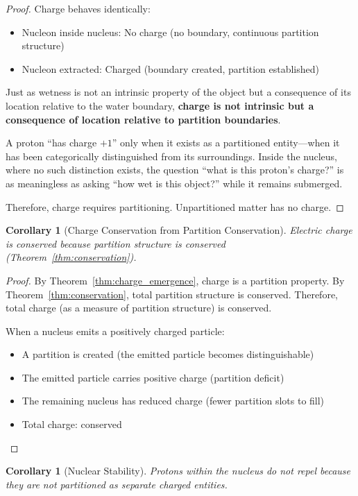 \documentclass[twocolumn,10pt,a4paper]{article}
\newtheorem{corollary}[theorem]{Corollary}
\theoremstyle{definition}
\theoremstyle{remark}
\begin{document}
\begin{proof}
Charge behaves identically:
\begin{itemize}
    \item Nucleon inside nucleus: No charge (no boundary, continuous partition structure)
    \item Nucleon extracted: Charged (boundary created, partition established)
\end{itemize}

Just as wetness is not an intrinsic property of the object but a consequence of its location relative to the water boundary, \textbf{charge is not intrinsic but a consequence of location relative to partition boundaries}.

A proton ``has charge $+1$'' only when it exists as a partitioned entity---when it has been categorically distinguished from its surroundings. Inside the nucleus, where no such distinction exists, the question ``what is this proton's charge?'' is as meaningless as asking ``how wet is this object?'' while it remains submerged.

Therefore, charge requires partitioning. Unpartitioned matter has no charge.
\end{proof}

\begin{corollary}[Charge Conservation from Partition Conservation]
\label{cor:charge_conservation}
Electric charge is conserved because partition structure is conserved (Theorem~\ref{thm:conservation}).
\end{corollary}

\begin{proof}
By Theorem~\ref{thm:charge_emergence}, charge is a partition property. By Theorem~\ref{thm:conservation}, total partition structure is conserved. Therefore, total charge (as a measure of partition structure) is conserved.

When a nucleus emits a positively charged particle:
\begin{itemize}
    \item A partition is created (the emitted particle becomes distinguishable)
    \item The emitted particle carries positive charge (partition deficit)
    \item The remaining nucleus has reduced charge (fewer partition slots to fill)
    \item Total charge: conserved
\end{itemize}
\end{proof}

\begin{corollary}[Nuclear Stability]
\label{cor:nuclear_stability}
Protons within the nucleus do not repel because they are not partitioned as separate charged entities.
\end{corollary}
\end{document}
